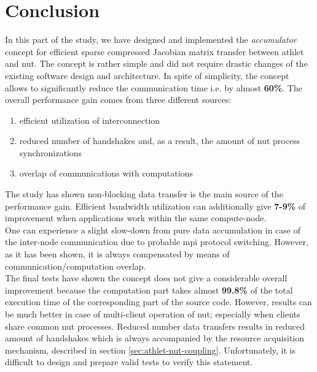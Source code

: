 \section{Conclusion}
\label{sec:accumulator-conclusions}


In this part of the study, we have designed and implemented the \textit{accumulator} concept for efficient sparse compressed Jacobian matrix transfer between \gls{athlet} and \gls{nut}. The concept is rather simple and did not require drastic changes of the existing software design and architecture. In spite of simplicity, the concept allows to significantly reduce the communication time i.e. by almost \textbf{60\%}. The overall performance gain comes from three different sources: 

\begin{enumerate}
	\item efficient utilization of interconnection
	\item reduced number of handshakes and, as a result, the amount of \gls{nut} process synchronizations
	\item overlap of communications with computations
\end{enumerate}

The study has shown non-blocking data transfer is the main source of the performance gain. Efficient bandwidth utilization can additionally give \textbf{7-9\%} of improvement when applications work within the same compute-node.\\


One can experience a slight slow-down from pure data accumulation in case of the inter-node communication due to probable \gls{mpi} protocol switching. However, as it has been shown, it is always compensated by means of communication/computation overlap.\\


The final tests have shown the concept does not give a considerable overall improvement because the computation part takes almost \textbf{99.8\%} of the total execution time of the corresponding part of the source code. However, results can be much better in case of multi-client operation of \gls{nut}; especially when clients share common \gls{nut} processes. Reduced number data transfers results in reduced amount of handshakes which is always accompanied by the resource acquisition mechanism, described in section \ref{sec:athlet-nut-coupling}. Unfortunately, it is difficult to design and prepare valid tests to verify this statement. \\


